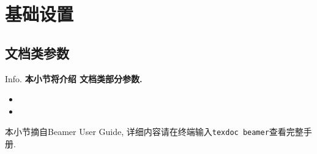 \section{基础设置}
\subsection{ 文档类参数}
\begin{frame}{Info.}
	\textbf{本小节将介绍  文档类部分参数.}
	\begin{multicols}{2}
		\begin{itemize}
			\item {}
			\item {}
		\end{itemize}
	\end{multicols}
	\vspace{2ex}本小节摘自\textcolor{scugreen}{Beamer User Guide}, 详细内容请在终端输入\alert{\texttt{texdoc beamer}}查看完整手册.
\end{frame}


